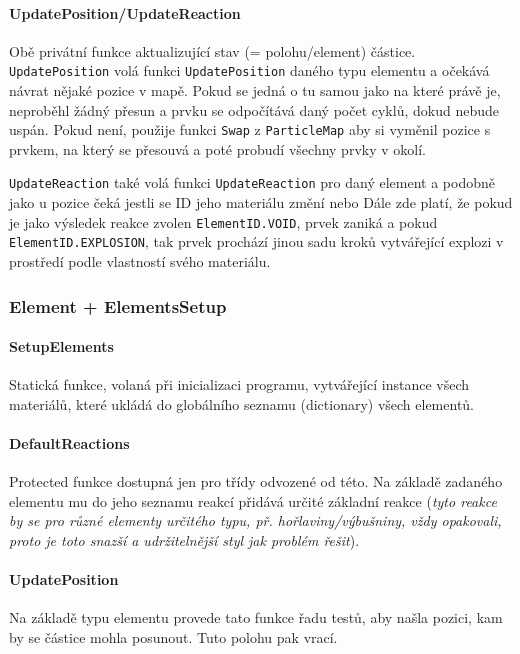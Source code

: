 \documentclass[a4paper, 12pt]{article}
\begin{document}
\paragraph{UpdatePosition/UpdateReaction}
Obě privátní funkce aktualizující stav (= polohu/element) částice.
\texttt{UpdatePosition} volá funkci \texttt{UpdatePosition} daného typu
elementu a očekává návrat nějaké pozice v mapě. Pokud se jedná o tu samou jako
na které právě je, neproběhl žádný přesun a prvku se odpočítává daný počet
cyklů, dokud nebude uspán. Pokud není, použije funkci \texttt{Swap} z \texttt{ParticleMap} 
aby si vyměnil pozice s prvkem, na který se přesouvá a poté probudí 
všechny prvky v okolí.

\texttt{UpdateReaction} také volá funkci \texttt{UpdateReaction} pro daný
element a podobně jako u pozice čeká jestli se ID jeho materiálu změní nebo
Dále zde platí, že pokud je jako výsledek reakce zvolen
\texttt{ElementID.VOID}, prvek zaniká a pokud \\\texttt{ElementID.EXPLOSION}, tak
prvek prochází jinou sadu kroků vytvářející explozi v prostředí podle
vlastností svého materiálu.

\subsubsection{Element + ElementsSetup}
\paragraph{SetupElements}
Statická funkce, volaná při inicializaci programu, vytvářející instance všech
materiálů, které ukládá do globálního seznamu (dictionary) všech elementů.

\paragraph{DefaultReactions}
Protected funkce dostupná jen pro třídy odvozené od této. Na základě zadaného
elementu mu do jeho seznamu reakcí přidává určité základní reakce (\emph{tyto
reakce by se pro různé elementy určitého typu, př. hořlaviny/výbušniny, vždy opakovali, proto je toto snazší a
udržitelnější styl jak problém řešit}).

\paragraph{UpdatePosition}
Na základě typu elementu provede tato funkce řadu testů, aby našla pozici, kam
by se částice mohla posunout. Tuto polohu pak vrací.
\end{document}
